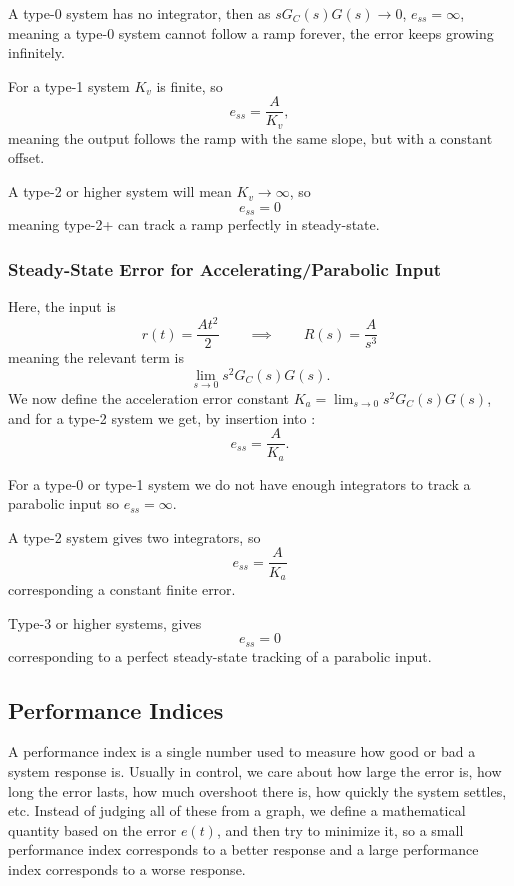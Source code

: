 A type-0 system has no integrator, then as $s G_C(s) G(s) \to 0$, $e_{ss} = \infty$, meaning a type-0 system cannot follow a ramp forever, the error keeps growing infinitely.

For a type-1 system $K_v$ is finite, so
\begin{equation*}
  e_{ss} = \frac{A}{K_v}
,\end{equation*}
meaning the output follows the ramp with the same slope, but with a constant offset.

A type-2 or higher system will mean $K_v \to \infty$, so
\begin{equation*}
  e_{ss} = 0
\end{equation*}
meaning type-2+ can track a ramp perfectly in steady-state.

\subsubsection{Steady-State Error for Accelerating/Parabolic Input}
Here, the input is
\begin{equation*}
  r(t) = \frac{At^2}{2} \qquad \implies \qquad R(s) = \frac{A}{s^3}
\end{equation*}
meaning the relevant term is
\begin{equation*}
  \lim_{s \to 0} s^2 G_C(s) G(s)
.\end{equation*}
We now define the acceleration error constant $K_a = \lim_{s \to 0} s^2 G_C(s) G(s)$, and for a type-2 system we get, by insertion into :
\begin{equation*}
  e_{ss} = \frac{A}{K_a}
.\end{equation*}

For a type-0 or type-1 system we do not have enough integrators to track a parabolic input so $e_{ss} = \infty$.

A type-2 system gives two integrators, so
\begin{equation*}
  e_{ss} = \frac{A}{K_a}
\end{equation*}
corresponding a constant finite error.

Type-3 or higher systems, gives
\begin{equation*}
  e_{ss} = 0
\end{equation*}
corresponding to a perfect steady-state tracking of a parabolic input.

\subsection{Performance Indices}
A performance index is a single number used to measure how good or bad a system response is.
Usually in control, we care about how large the error is, how long the error lasts, how much overshoot there is, how quickly the system settles, etc.
Instead of judging all of these from a graph, we define a mathematical quantity based on the error $e(t)$, and then try to minimize it, so a small performance index corresponds to a better response and a large performance index corresponds to a worse response.

